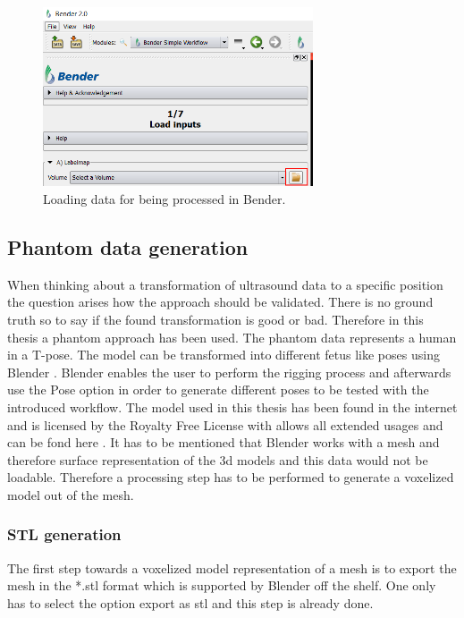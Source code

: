 \begin{figure} [!htb]
    \centering
	\includegraphics[width=8cm]{content/images/bendLoad}
	\caption{Loading data for being processed in Bender.} 
	\label{fig:bendLoad}
\end{figure}

\subsection{Phantom data generation}

When thinking about a transformation of ultrasound data to a specific position the question arises how the approach should be validated. There is no ground truth so to say if the found transformation is good or bad. Therefore in this thesis a phantom approach has been used. The phantom data represents a human in a T-pose. The model can be transformed into different fetus like poses using Blender \cite{Foundation2019Blender}. Blender enables the user to perform the rigging process and afterwards use the Pose option in order to generate different poses to be tested with the introduced workflow. The model used in this thesis has been found in the internet and is licensed by the Royalty Free License with allows all extended usages and can be fond here \cite{Squidifier2010DetailedMan}. It has to be mentioned that Blender works with a mesh and therefore surface representation of the \gls{3d} models and this data would not be loadable. Therefore a processing step has to be performed to generate a voxelized model out of the mesh.

\subsubsection{STL generation}

The first step towards a voxelized model representation of a mesh is to export the mesh in the *.stl format which is supported by Blender off the shelf. One only has to select the option export as stl and this step is already done.

